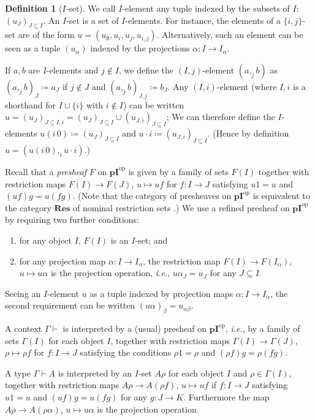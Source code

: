 \documentclass[english]{PaperTools/latex/entcs}
\theoremstyle{plain}
\theoremstyle{definition}
\newtheorem{definition}[theorem]{Definition}
\theoremstyle{remark}
\def\pI{\ensuremath{\mathbf{pI}}}
\def\ie{\textit{i.e.}}
\def\opp{\mathrm{op}}
\begin{document}
\begin{definition}[$I$-set]
  We call $I$-element any tuple indexed by the subsets of $I$: $(u_J)_{J ⊆ I}$.
  An $I$-set is a set of $I$-elements.  For instance, the elements of a
  $\{i,j\}$-set are of the form $u = (u_∅,u_i,u_j,u_{i,j})$.
  Alternatively, such an element can be seen as a tuple $(u_α)$ indexed
  by the projections $α : I → I_α$.
\end{definition}
  If $a,b$ are $I$-elements and $j ∉ I$, we define the $(I,j)$-element
  $(a ,_j b)$ as $(a ,_j b)_J ≔ a_J$ if $j ∉ J$ and $(a ,_j b)_{J,j} ≔ b_J$.
  Any $(I,i)$-element (where $I,i$ is a shorthand for $I ∪ \{i\}$ with
  $i ∉ I$) can be written $u = (u_J)_{J ⊆ I,i} = (u_J)_{J ⊆ I} ∪ (u_{J,i})_{J ⊆ I}$;
  We can therefore define the $I$-elements $u (i\,0) ≔ (u_J)_{J ⊆ I}$ and
  $u · i ≔ (u_{J,i})_{J ⊆ I}$.
  (Hence by definition $u = (u (i\,0) ,_i u · i)$.)

Recall that a \emph{presheaf} $F$ on $\pI^\opp$ is given by a family of
sets $F(I)$ together with restriction maps $F(I) → F(J)$, $u ↦ uf$ for
$f : I → J$ satisfying $u1 = u$ and $(uf)g = u(fg)$.
(Note that the category of presheaves on $\pI^\opp$ is equivalent to the
category $\mathbf{Res}$ of nominal restriction sets
\cite[rem.~9.9 p.~161]{PittsAM:nomsns}.)
%
We use a refined presheaf on $\pI^\opp$ by requiring two further conditions:
%
\begin{enumerate}
  \item for any object $I$, $F(I)$ is an $I$-set; and
    \label{itm:presheaf-refinement-1}
  \item for any projection map $α : I → I_α$, the restriction
    map $F(I) → F(I_α)$, $u ↦ uα$ is the projection operation, \ie,
    $uα_J = u_J$ for any $J ⊆ I$.
    \label{itm:presheaf-refinement-2}
\end{enumerate}
%
Seeing an $I$-element $u$ as a tuple indexed by projection maps
$α : I → I_α$, the second requirement can be written $(uα)_β = u_{αβ}$.

\smallskip
A context $Γ ⊢$ is interpreted by a (usual) presheaf on $\pI^\opp$, \ie,
by a family of sets $Γ(I)$ for each object $I$, together with
restriction maps $Γ(I) → Γ(J)$, $ρ ↦ ρf$ for $f : I → J$ satisfying the
conditions $ρ1 = ρ$ and $(ρf)g = ρ(fg)$.

A type $Γ ⊢ A$ is interpreted by an $I$-set $Aρ$ for each object $I$ and
$ρ ∈ Γ(I)$,
together with restriction maps $Aρ → A(ρf)$, $u ↦ uf$ if $f : I → J$
satisfying $u1 = u$ and $(uf)g = u(fg)$ for any $g : J → K$.
Furthermore the map $Aρ → A(ρα)$, $u ↦ uα$ is the projection operation.
\end{document}
